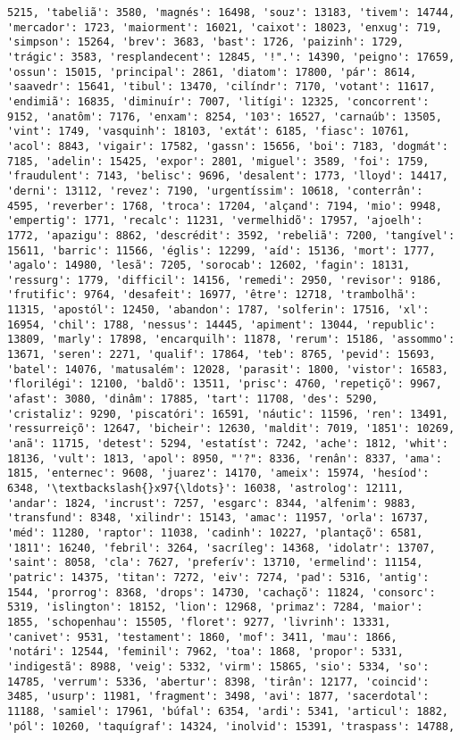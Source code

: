 \documentclass[11pt]{article}
\begin{document}
\begin{Verbatim}[commandchars=\\\{\}]
5215, 'tabeliã': 3580, 'magnés': 16498, 'souz': 13183, 'tivem': 14744, 'mercador': 1723, 'maiorment': 16021, 'caixot': 18023, 'enxug': 719, 'simpson': 15264, 'brev': 3683, 'bast': 1726, 'paizinh': 1729, 'trágic': 3583, 'resplandecent': 12845, '!".': 14390, 'peigno': 17659, 'ossun': 15015, 'principal': 2861, 'diatom': 17800, 'pár': 8614, 'saavedr': 15641, 'tibul': 13470, 'cilíndr': 7170, 'votant': 11617, 'endimiã': 16835, 'diminuír': 7007, 'litígi': 12325, 'concorrent': 9152, 'anatôm': 7176, 'enxam': 8254, '103': 16527, 'carnaúb': 13505, 'vint': 1749, 'vasquinh': 18103, 'extát': 6185, 'fiasc': 10761, 'acol': 8843, 'vigair': 17582, 'gassn': 15656, 'boi': 7183, 'dogmát': 7185, 'adelin': 15425, 'expor': 2801, 'miguel': 3589, 'foi': 1759, 'fraudulent': 7143, 'belisc': 9696, 'desalent': 1773, 'lloyd': 14417, 'derni': 13112, 'revez': 7190, 'urgentíssim': 10618, 'conterrân': 4595, 'reverber': 1768, 'troca': 17204, 'alçand': 7194, 'mio': 9948, 'empertig': 1771, 'recalc': 11231, 'vermelhidõ': 17957, 'ajoelh': 1772, 'apazigu': 8862, 'descrédit': 3592, 'rebeliã': 7200, 'tangível': 15611, 'barric': 11566, 'églis': 12299, 'aíd': 15136, 'mort': 1777, 'agalo': 14980, 'lesã': 7205, 'sorocab': 12602, 'fagin': 18131, 'ressurg': 1779, 'difficil': 14156, 'remedi': 2950, 'revisor': 9186, 'frutific': 9764, 'desafeit': 16977, 'être': 12718, 'trambolhã': 11315, 'apostól': 12450, 'abandon': 1787, 'solferin': 17516, 'xl': 16954, 'chil': 1788, 'nessus': 14445, 'apiment': 13044, 'republic': 13809, 'marly': 17898, 'encarquilh': 11878, 'rerum': 15186, 'assommo': 13671, 'seren': 2271, 'qualif': 17864, 'teb': 8765, 'pevid': 15693, 'batel': 14076, 'matusalém': 12028, 'parasit': 1800, 'vistor': 16583, 'florilégi': 12100, 'baldõ': 13511, 'prisc': 4760, 'repetiçõ': 9967, 'afast': 3080, 'dinâm': 17885, 'tart': 11708, 'des': 5290, 'cristaliz': 9290, 'piscatóri': 16591, 'náutic': 11596, 'ren': 13491, 'ressurreiçõ': 12647, 'bicheir': 12630, 'maldit': 7019, '1851': 10269, 'anã': 11715, 'detest': 5294, 'estatíst': 7242, 'ache': 1812, 'whit': 18136, 'vult': 1813, 'apol': 8950, "'?": 8336, 'renân': 8337, 'ama': 1815, 'enternec': 9608, 'juarez': 14170, 'ameix': 15974, 'hesíod': 6348, '\textbackslash{}x97{\ldots}': 16038, 'astrolog': 12111, 'andar': 1824, 'incrust': 7257, 'esgarc': 8344, 'alfenim': 9883, 'transfund': 8348, 'xilindr': 15143, 'amac': 11957, 'orla': 16737, 'méd': 11280, 'raptor': 11038, 'cadinh': 10227, 'plantaçõ': 6581, '1811': 16240, 'febril': 3264, 'sacríleg': 14368, 'idolatr': 13707, 'saint': 8058, 'cla': 7627, 'preferív': 13710, 'ermelind': 11154, 'patric': 14375, 'titan': 7272, 'eiv': 7274, 'pad': 5316, 'antig': 1544, 'prorrog': 8368, 'drops': 14730, 'cachaçõ': 11824, 'consorc': 5319, 'islington': 18152, 'lion': 12968, 'primaz': 7284, 'maior': 1855, 'schopenhau': 15505, 'floret': 9277, 'livrinh': 13331, 'canivet': 9531, 'testament': 1860, 'mof': 3411, 'mau': 1866, 'notári': 12544, 'feminil': 7962, 'toa': 1868, 'propor': 5331, 'indigestã': 8988, 'veig': 5332, 'virm': 15865, 'sio': 5334, 'so': 14785, 'verrum': 5336, 'abertur': 8398, 'tirân': 12177, 'coincid': 3485, 'usurp': 11981, 'fragment': 3498, 'avi': 1877, 'sacerdotal': 11188, 'samiel': 17961, 'búfal': 6354, 'ardi': 5341, 'articul': 1882, 'pól': 10260, 'taquígraf': 14324, 'inolvid': 15391, 'traspass': 14788, 
\end{Verbatim}
\end{document}
